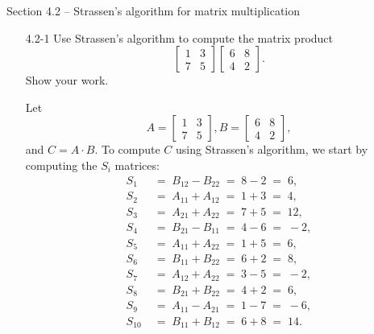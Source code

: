 \newpage

{\large Section 4.2 {--} Strassen's algorithm for matrix multiplication}

\begin{enumerate}

\item[4.2{-}1]{Use Strassen's algorithm to compute the matrix product
\[
\begin{bmatrix}
  1 & 3\\
  7 & 5
\end{bmatrix}
\begin{bmatrix}
  6 & 8\\
  4 & 2
\end{bmatrix}
.
\]
Show your work.
}

\begin{framed}
Let
\[
  A = \begin{bmatrix} 1 & 3\\ 7 & 5 \end{bmatrix},
  B = \begin{bmatrix} 6 & 8\\ 4 & 2 \end{bmatrix},
\]
and $C = A \cdot B$. To compute $C$ using Strassen's algorithm, we start by
computing the $S_i$ matrices:
\begin{equation*}
\begin{aligned}
S_1 \; &= \; B_{12} - B_{22} \; = \; 8 - 2 \; = \; 6,\\
S_2 \; &= \; A_{11} + A_{12} \; = \; 1 + 3 \; = \; 4,\\
S_3 \; &= \; A_{21} + A_{22} \; = \; 7 + 5 \; = \; 12,\\
S_4 \; &= \; B_{21} - B_{11} \; = \; 4 - 6 \; = \; -2,\\
S_5 \; &= \; A_{11} + A_{22} \; = \; 1 + 5 \; = \; 6,\\
S_6 \; &= \; B_{11} + B_{22} \; = \; 6 + 2 \; = \; 8,\\
S_7 \; &= \; A_{12} + A_{22} \; = \; 3 - 5 \; = \; -2,\\
S_8 \; &= \; B_{21} + B_{22} \; = \; 4 + 2 \; = \; 6,\\
S_9 \; &= \; A_{11} - A_{21} \; = \; 1 - 7 \; = \; -6,\\
S_{10} \; &= \; B_{11} + B_{12} \; = \; 6 + 8 \; = \; 14.
\end{aligned}
\end{equation*}


\end{framed}
\end{enumerate}
